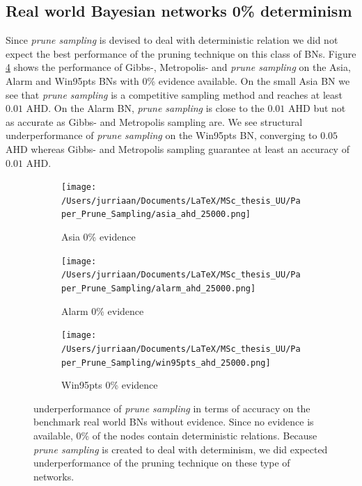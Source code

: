 \documentclass[a4paper, twoside, 11pt]{report}
\theoremstyle{plain}
\theoremstyle{definition}
\theoremstyle{remark}
\newcommand{\ps}{\textit{prune sampling }}
\begin{document}
\subsection{Real world Bayesian networks 0\% determinism}\label{real_world_0_ev}
Since \ps is devised to deal with deterministic relation we did not expect the best performance of the pruning technique on this class of BNs. Figure \ref{results1} shows the performance of Gibbs-, Metropolis- and \ps on the Asia, Alarm and Win95pts BNs with 0\% evidence available. On the small Asia BN we see that \ps is a competitive sampling method and reaches at least $0.01$ AHD. On the Alarm BN, \ps is close to the $0.01$ AHD but not as accurate as Gibbs- and Metropolis sampling are. We see structural underperformance of \ps on the Win95pts BN, converging to $0.05$ AHD whereas Gibbs- and Metropolis sampling guarantee at least an accuracy of $0.01$ AHD.
\begin{figure}[H]
\centering
\begin{subfigure}{0.5\textwidth}
\texttt{[image: /Users/jurriaan/Documents/LaTeX/MSc\_thesis\_UU/Paper\_Prune\_Sampling/asia\_ahd\_25000.png]}
\caption{Asia 0\% evidence}%
\label{asia}%
\end{subfigure}\hfill%
\begin{subfigure}{0.5\textwidth}
\texttt{[image: /Users/jurriaan/Documents/LaTeX/MSc\_thesis\_UU/Paper\_Prune\_Sampling/alarm\_ahd\_25000.png]}
\caption{Alarm 0\% evidence}%
\label{alarm}%
\end{subfigure}%
\begin{subfigure}{0.5\textwidth}
\texttt{[image: /Users/jurriaan/Documents/LaTeX/MSc\_thesis\_UU/Paper\_Prune\_Sampling/win95pts\_ahd\_25000.png]}
\caption{Win95pts 0\% evidence}%
\label{win95pts}%
\end{subfigure}\hfill%
\vspace{0.75pc}
\caption{underperformance of \ps in terms of accuracy on the benchmark real world BNs without evidence. Since no evidence is available, 0\% of the nodes contain deterministic relations. Because \ps is created to deal with determinism, we did expected underperformance of the pruning technique on these type of networks.  }
\label{results1}
\end{figure}

\newpage
\end{document}
